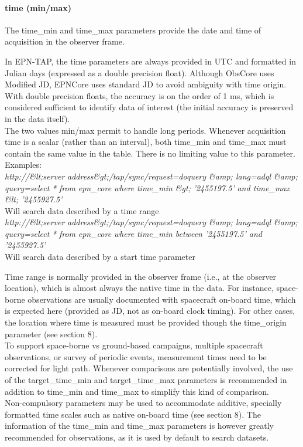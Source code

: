 \documentclass[11pt,a4paper]{ivoa}
\begin{document}
\paragraph{time (min/max)}

The time\_min and time\_max parameters provide the date and time of acquisition in the observer frame. 

In EPN-TAP, the time parameters are always provided in UTC and formatted in Julian days (expressed as a double precision float). Although ObsCore uses Modified JD, EPNCore uses standard JD to avoid ambiguity with time origin. With double precision floats, the accuracy is on the order of 1 ms, which is considered sufficient to identify data of interest (the initial accuracy is preserved in the data itself).\\ The two values min/max permit to handle long periods. Whenever acquisition time is a scalar (rather than an interval), both time\_min and time\_max must contain the same value in the table. There is no limiting value to this parameter.\\ Examples:\\ \emph{http://\&lt;server} \emph{address\&gt;/tap/sync/request=doquery \&amp; lang=adql \&amp; query=select} \emph{*} \emph{from} \emph{epn\_core} \emph{where} \emph{time\_min \&gt;} \emph{'2455197.5'} \emph{and time\_max \&lt; '2455927.5'} \\ Will search data described by a time range \\ \emph{http://\&lt;server} \emph{address\&gt;/tap/sync/request=doquery \&amp; lang=adql \&amp; query=select} \emph{*} \emph{from} \emph{epn\_core} \emph{where} \emph{time\_min between} \emph{'2455197.5' and '2455927.5'} \\ Will search data described by a start time parameter

Time range is normally provided in the observer frame (i.e., at the observer location), which is almost always the native time in the data. For instance, space-borne observations are usually documented with spacecraft on-board time, which is expected here (provided as JD, not as on-board clock timing). For other cases, the location where time is measured must be provided though the time\_origin parameter (see section 8).\\To support space-borne vs ground-based campaigns, multiple spacecraft observations, or survey of periodic events, measurement times need to be corrected for light path. Whenever comparisons are potentially involved, the use of the target\_time\_min and target\_time\_max parameters is recommended in addition to time\_min and time\_max to simplify this kind of comparison.\\Non-compulsory parameters may be used to accommodate additive, specially formatted time scales such as native on-board time (see section 8). The information of the time\_min and time\_max parameters is however greatly recommended for observations, as it is used by default to search datasets.
\end{document}
